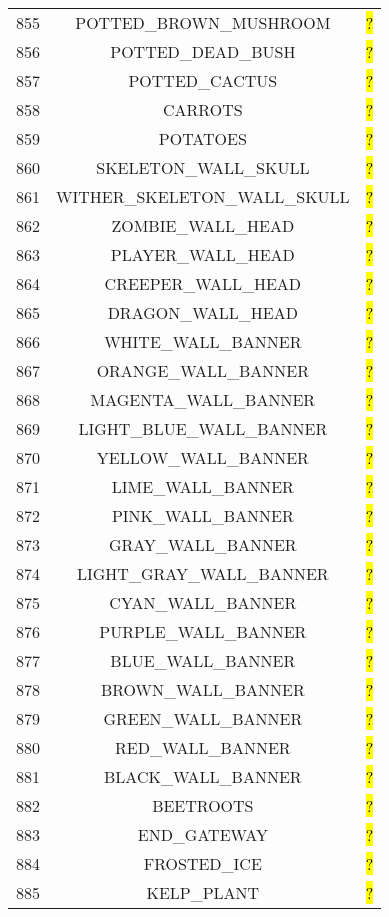 \documentclass[11pt]{article}
\newcommand\myworries[1]{\sethlcolor{red}\hl{#1}}
\begin{document}
\begin{longtable}{ |c|c|c| }
	855 & POTTED\_BROWN\_MUSHROOM & \myworries{?} \\
	856 & POTTED\_DEAD\_BUSH & \myworries{?} \\
	857 & POTTED\_CACTUS & \myworries{?} \\
	858 & CARROTS & \myworries{?} \\
	859 & POTATOES & \myworries{?} \\
	860 & SKELETON\_WALL\_SKULL & \myworries{?} \\
	861 & WITHER\_SKELETON\_WALL\_SKULL & \myworries{?} \\
	862 & ZOMBIE\_WALL\_HEAD & \myworries{?} \\
	863 & PLAYER\_WALL\_HEAD & \myworries{?} \\
	864 & CREEPER\_WALL\_HEAD & \myworries{?} \\
	865 & DRAGON\_WALL\_HEAD & \myworries{?} \\
	866 & WHITE\_WALL\_BANNER & \myworries{?} \\
	867 & ORANGE\_WALL\_BANNER & \myworries{?} \\
	868 & MAGENTA\_WALL\_BANNER & \myworries{?} \\
	869 & LIGHT\_BLUE\_WALL\_BANNER & \myworries{?} \\
	870 & YELLOW\_WALL\_BANNER & \myworries{?} \\
	871 & LIME\_WALL\_BANNER & \myworries{?} \\
	872 & PINK\_WALL\_BANNER & \myworries{?} \\
	873 & GRAY\_WALL\_BANNER & \myworries{?} \\
	874 & LIGHT\_GRAY\_WALL\_BANNER & \myworries{?} \\
	875 & CYAN\_WALL\_BANNER & \myworries{?} \\
	876 & PURPLE\_WALL\_BANNER & \myworries{?} \\
	877 & BLUE\_WALL\_BANNER & \myworries{?} \\
	878 & BROWN\_WALL\_BANNER & \myworries{?} \\
	879 & GREEN\_WALL\_BANNER & \myworries{?} \\
	880 & RED\_WALL\_BANNER & \myworries{?} \\
	881 & BLACK\_WALL\_BANNER & \myworries{?} \\
	882 & BEETROOTS & \myworries{?} \\
	883 & END\_GATEWAY & \myworries{?} \\
	884 & FROSTED\_ICE & \myworries{?} \\
	885 & KELP\_PLANT & \myworries{?} \\

\end{longtable}
\end{document}

